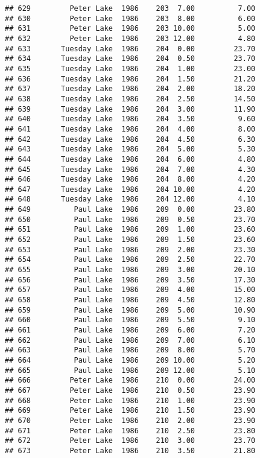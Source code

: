 \documentclass[
]{article}
\begin{document}
\begin{verbatim}
## 629         Peter Lake  1986    203  7.00          7.00
## 630         Peter Lake  1986    203  8.00          6.00
## 631         Peter Lake  1986    203 10.00          5.00
## 632         Peter Lake  1986    203 12.00          4.80
## 633       Tuesday Lake  1986    204  0.00         23.70
## 634       Tuesday Lake  1986    204  0.50         23.70
## 635       Tuesday Lake  1986    204  1.00         23.00
## 636       Tuesday Lake  1986    204  1.50         21.20
## 637       Tuesday Lake  1986    204  2.00         18.20
## 638       Tuesday Lake  1986    204  2.50         14.50
## 639       Tuesday Lake  1986    204  3.00         11.90
## 640       Tuesday Lake  1986    204  3.50          9.60
## 641       Tuesday Lake  1986    204  4.00          8.00
## 642       Tuesday Lake  1986    204  4.50          6.30
## 643       Tuesday Lake  1986    204  5.00          5.30
## 644       Tuesday Lake  1986    204  6.00          4.80
## 645       Tuesday Lake  1986    204  7.00          4.30
## 646       Tuesday Lake  1986    204  8.00          4.20
## 647       Tuesday Lake  1986    204 10.00          4.20
## 648       Tuesday Lake  1986    204 12.00          4.10
## 649          Paul Lake  1986    209  0.00         23.80
## 650          Paul Lake  1986    209  0.50         23.70
## 651          Paul Lake  1986    209  1.00         23.60
## 652          Paul Lake  1986    209  1.50         23.60
## 653          Paul Lake  1986    209  2.00         23.30
## 654          Paul Lake  1986    209  2.50         22.70
## 655          Paul Lake  1986    209  3.00         20.10
## 656          Paul Lake  1986    209  3.50         17.30
## 657          Paul Lake  1986    209  4.00         15.00
## 658          Paul Lake  1986    209  4.50         12.80
## 659          Paul Lake  1986    209  5.00         10.90
## 660          Paul Lake  1986    209  5.50          9.10
## 661          Paul Lake  1986    209  6.00          7.20
## 662          Paul Lake  1986    209  7.00          6.10
## 663          Paul Lake  1986    209  8.00          5.70
## 664          Paul Lake  1986    209 10.00          5.20
## 665          Paul Lake  1986    209 12.00          5.10
## 666         Peter Lake  1986    210  0.00         24.00
## 667         Peter Lake  1986    210  0.50         23.90
## 668         Peter Lake  1986    210  1.00         23.90
## 669         Peter Lake  1986    210  1.50         23.90
## 670         Peter Lake  1986    210  2.00         23.90
## 671         Peter Lake  1986    210  2.50         23.80
## 672         Peter Lake  1986    210  3.00         23.70
## 673         Peter Lake  1986    210  3.50         21.80

\end{verbatim}
\end{document}
